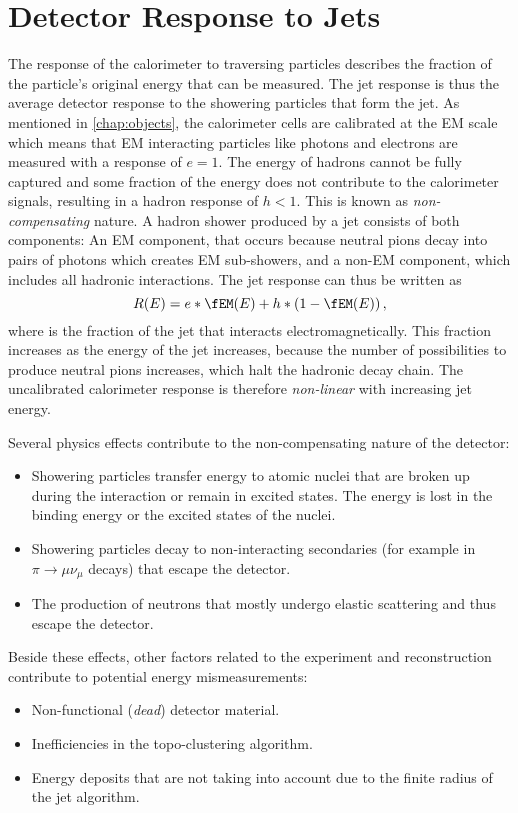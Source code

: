 \section{Detector Response to Jets}
\label{sec:detector-response}
The response of the calorimeter to traversing particles describes the fraction of the particle's original energy that can be measured. The jet response is thus the average detector response to the showering particles that form the jet.
As mentioned in \cref{chap:objects}, the calorimeter cells are calibrated at the EM scale which means that EM interacting particles like photons and electrons are measured with a response of $e = 1$. The energy of hadrons cannot be fully captured and some fraction of the energy does not contribute to the calorimeter signals, resulting in a hadron response of $h < 1$. This is known as \emph{non-compensating} nature.
A hadron shower produced by a jet consists of both components:
An EM component, that occurs because neutral pions decay into pairs of photons which creates EM sub-showers, and a non-EM component, which includes all hadronic interactions.
The jet response can thus be written as
\begin{equation}
    R(E) = e*\fEM(E) + h * \left(1 - \fEM(E)\right),
\end{equation}
where \fEM is the fraction of the jet that interacts electromagnetically. This fraction increases as the energy of the jet increases, because the number of possibilities to produce neutral pions increases, which halt the hadronic decay chain. The uncalibrated calorimeter response is therefore \emph{non-linear} with increasing jet energy.

Several physics effects contribute to the non-compensating nature of the detector:
\begin{itemize}
    \item Showering particles transfer energy to atomic nuclei that are broken up during the interaction or remain in excited states. The energy is lost in the binding energy or the excited states of the nuclei.
    \item Showering particles decay to non-interacting secondaries (for example in $\pi \rightarrow \mu \nu_\mu$ decays) that escape the detector.
    \item The production of neutrons that mostly undergo elastic scattering and thus escape the detector.
\end{itemize}
Beside these effects, other factors related to the experiment and reconstruction contribute to potential energy mismeasurements:
\begin{itemize}
    \item Non-functional (\emph{dead}) detector material.
    \item Inefficiencies in the topo-clustering algorithm.
    \item Energy deposits that are not taking into account due to the finite radius of the jet algorithm.
\end{itemize}

